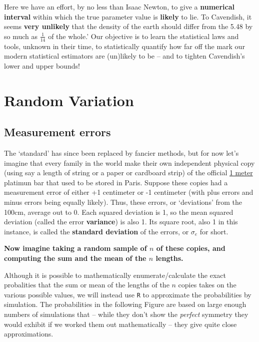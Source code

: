 \documentclass[]{book}
\begin{document}
Here we have an effort, by no less than Isaac Newton, to give a \textbf{numerical interval} within which the true parameter value is \textbf{likely} to lie. To Cavendish, it seems \textbf{very unlikely} that the density of the earth should differ from the 5.48 by so much as \(\frac{1}{14}\) of the whole.' Our objective is to learn the statistical laws and tools, unknown in their time, to statistically quantify how far off the mark our modern statistical estimators are (un)likely to be -- and to tighten Cavendish's lower and upper bounds!

\hypertarget{random-variation}{%
\section{Random Variation}\label{random-variation}}

\hypertarget{measurement-errors}{%
\subsection{Measurement errors}\label{measurement-errors}}

The `standard' has since been replaced by fancier methods, but for now let's imagine that every family in the world make their own independent physical copy (using say a length of string or a paper or cardboard strip) of the official \href{https://en.wikipedia.org/wiki/History_of_the_metre}{1 meter} platimun bar that used to be stored in Paris. Suppose these copies had a measurement error of either +1 centimeter or -1 centimeter (with plus errors and minus errors being equally likely). Thus, these errors, or `deviations' from the 100cm, average out to 0. Each squared deviation is 1, so the mean squared deviation (called the error \textbf{variance}) is also 1. Its square root, also 1 in this instance, is called the \textbf{standard deviation} of the errors, or \(\sigma_{e}\) for short.

\textbf{Now imagine taking a random sample of \(n\) of these copies, and computing the sum and the mean of the \(n\) lengths.}

Although it is possible to mathematically enumerate/calculate the exact probalities that the sum or mean of the lengths of the \(n\) copies takes on the various possible values, we will instead use \texttt{R} to approximate the probabilities by simulation. The probabilities in the following Figure are based on large enough numbers of simulations that -- while they don't show the \emph{perfect} symmetry they would exhibit if we worked them out mathematically -- they give quite close approximations.
\end{document}
